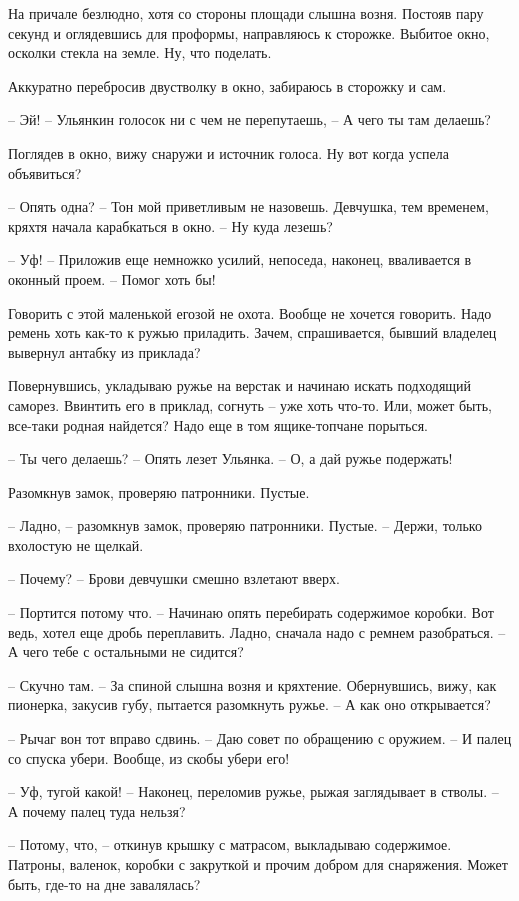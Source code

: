 \documentclass[a4paper]{book}
\begin{document}
На причале безлюдно, хотя со стороны площади слышна возня. Постояв пару секунд и оглядевшись для проформы, направляюсь к сторожке. Выбитое окно, осколки стекла на земле. Ну, что поделать. 

Аккуратно перебросив двустволку в окно, забираюсь в сторожку и сам. 

-- Эй! -- Ульянкин голосок ни с чем не перепутаешь, --  А чего ты там делаешь?

Поглядев в окно, вижу снаружи и источник голоса. Ну вот когда успела объявиться?

-- Опять одна? -- Тон мой приветливым не назовешь. Девчушка, тем временем, кряхтя начала карабкаться в окно. -- Ну куда лезешь?

-- Уф! -- Приложив еще немножко усилий, непоседа, наконец, вваливается в оконный проем. -- Помог хоть бы!

Говорить с этой маленькой егозой не охота. Вообще не хочется говорить. Надо ремень хоть как-то к ружью приладить. Зачем, спрашивается, бывший владелец вывернул антабку из приклада?

Повернувшись, укладываю ружье на верстак и начинаю искать подходящий саморез. Ввинтить его в приклад, согнуть -- уже хоть что-то. Или, может быть, все-таки родная найдется? Надо еще в том ящике-топчане порыться. 

-- Ты чего делаешь? -- Опять лезет Ульянка. -- О, а дай ружье подержать!

Разомкнув замок, проверяю патронники. Пустые. 

-- Ладно, -- разомкнув замок, проверяю патронники. Пустые. -- Держи, только вхолостую не щелкай. 

-- Почему? -- Брови девчушки смешно взлетают вверх.

-- Портится потому что. -- Начинаю опять перебирать содержимое коробки. Вот ведь, хотел еще дробь переплавить. Ладно, сначала надо с ремнем разобраться. -- А чего тебе с остальными не сидится? 

-- Скучно там. -- За спиной слышна возня и кряхтение. Обернувшись, вижу, как пионерка, закусив губу, пытается разомкнуть ружье. -- А как оно открывается?

-- Рычаг вон тот вправо сдвинь. -- Даю совет по обращению с оружием. -- И палец со спуска убери. Вообще, из скобы убери его!

-- Уф, тугой какой! -- Наконец, переломив ружье, рыжая заглядывает в стволы. -- А почему палец  туда нельзя?

-- Потому, что, -- откинув крышку с матрасом, выкладываю содержимое. Патроны, валенок, коробки с закруткой и прочим добром для снаряжения. Может быть, где-то на дне завалялась?
\end{document}
